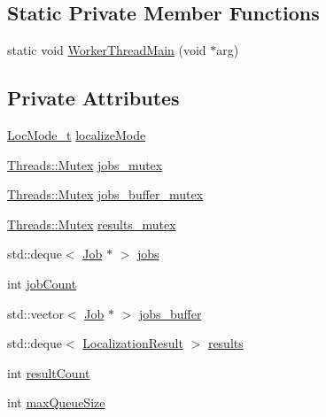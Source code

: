 \subsection*{Static Private Member Functions}
\begin{DoxyCompactItemize}
\item 
static void \hyperlink{class_queued_c_p_u_tracker_ac6d5c0b441567c7da19bb864b885ecb3}{Worker\+Thread\+Main} (void $\ast$arg)
\end{DoxyCompactItemize}
\subsection*{Private Attributes}
\begin{DoxyCompactItemize}
\item 
\hyperlink{qtrk__c__api_8h_a6ba72ec1daa19642f85a47defe8f0812}{Loc\+Mode\+\_\+t} \hyperlink{class_queued_c_p_u_tracker_abcb3ff2900fe26e671c650670e1acb9b}{localize\+Mode}
\item 
\hyperlink{struct_threads_1_1_mutex}{Threads\+::\+Mutex} \hyperlink{class_queued_c_p_u_tracker_a1af90038909506f439539d181cee0365}{jobs\+\_\+mutex}
\item 
\hyperlink{struct_threads_1_1_mutex}{Threads\+::\+Mutex} \hyperlink{class_queued_c_p_u_tracker_a5866ed5cbdbadd28b238c8d1b0bc2d72}{jobs\+\_\+buffer\+\_\+mutex}
\item 
\hyperlink{struct_threads_1_1_mutex}{Threads\+::\+Mutex} \hyperlink{class_queued_c_p_u_tracker_a4cf7f011a2dc9f2e3bcf08c9086eb20d}{results\+\_\+mutex}
\item 
std\+::deque$<$ \hyperlink{struct_queued_c_p_u_tracker_1_1_job}{Job} $\ast$ $>$ \hyperlink{class_queued_c_p_u_tracker_a21a1ce476dd3531d36a0b8d86b6319ed}{jobs}
\item 
int \hyperlink{class_queued_c_p_u_tracker_adb399632cbd49cd0f38da7b8395579e7}{job\+Count}
\item 
std\+::vector$<$ \hyperlink{struct_queued_c_p_u_tracker_1_1_job}{Job} $\ast$ $>$ \hyperlink{class_queued_c_p_u_tracker_a16d824830e3e374757f1ba1f3a3899be}{jobs\+\_\+buffer}
\item 
std\+::deque$<$ \hyperlink{struct_localization_result}{Localization\+Result} $>$ \hyperlink{class_queued_c_p_u_tracker_ad6f5f2d749a7643b727d540a9283d68d}{results}
\item 
int \hyperlink{class_queued_c_p_u_tracker_aa80e370d25cc7d379e29ab902a97caf5}{result\+Count}
\item 
int \hyperlink{class_queued_c_p_u_tracker_a0ab1a06cd49f58c5551d9327e50bb904}{max\+Queue\+Size}

\end{DoxyCompactItemize}

